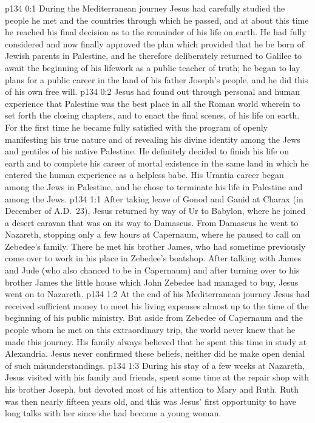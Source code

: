 \author{Midwayer Commission}
\vs p134 0:1 During the Mediterranean journey Jesus had carefully studied the people he met and the countries through which he passed, and at about this time he reached his final decision as to the remainder of his life on earth. He had fully considered and now finally approved the plan which provided that he be born of Jewish parents in Palestine, and he therefore deliberately returned to Galilee to await the beginning of his lifework as a public teacher of truth; he began to lay plans for a public career in the land of his father Joseph’s people, and he did this of his own free will.\plusone
\vs p134 0:2 Jesus had found out through personal and human experience that Palestine was the best place in all the Roman world wherein to set forth the closing chapters, and to enact the final scenes, of his life on earth. For the first time he became fully satisfied with the program of openly manifesting his true nature and of revealing his divine identity among the Jews and gentiles of his native Palestine. He definitely decided to finish his life on earth and to complete his career of mortal existence in the same land in which he entered the human experience as a helpless babe. His Urantia career began among the Jews in Palestine, and he chose to terminate his life in Palestine and among the Jews.
\vs p134 1:1 After taking leave of Gonod and Ganid at Charax (in December of A.D.~23), Jesus returned by way of Ur to Babylon, where he joined a desert caravan that was on its way to Damascus. From Damascus he went to Nazareth, stopping only a few hours at Capernaum, where he paused to call on Zebedee’s family. There he met his brother James, who had sometime previously come over to work in his place in Zebedee’s boatshop. After talking with James and Jude (who also chanced to be in Capernaum) and after turning over to his brother James the little house which John Zebedee had managed to buy, Jesus went on to Nazareth.
\vs p134 1:2 At the end of his Mediterranean journey Jesus had received sufficient money to meet his living expenses almost up to the time of the beginning of his public ministry. But aside from Zebedee of Capernaum and the people whom he met on this extraordinary trip, the world never knew that he made this journey. His family always believed that he spent this time in study at Alexandria. Jesus never confirmed these beliefs, neither did he make open denial of such misunderstandings.
\vs p134 1:3 During his stay of a few weeks at Nazareth, Jesus visited with his family and friends, spent some time at the repair shop with his brother Joseph, but devoted most of his attention to Mary and Ruth. Ruth was then nearly fifteen years old, and this was Jesus’ first opportunity to have long talks with her since she had become a young woman.
